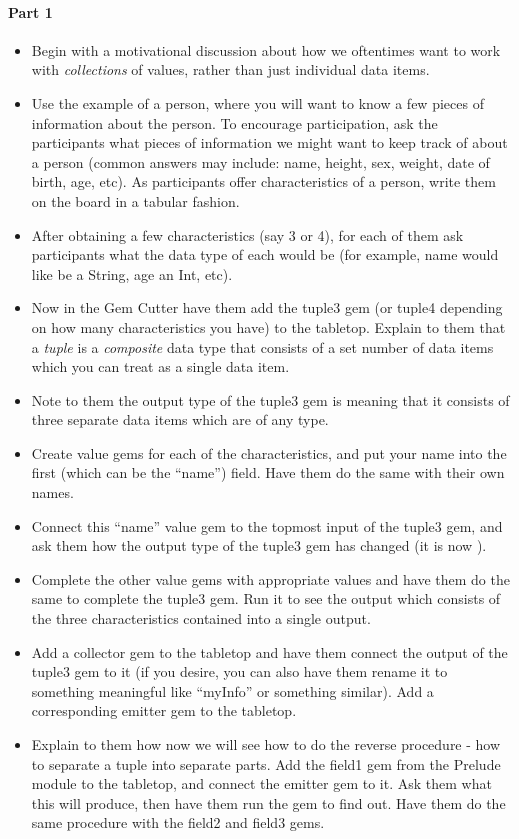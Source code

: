 	{
		\paragraph{Part 1}
		
		\begin{itemize}
			\item Begin with a motivational discussion about how we oftentimes want to work with \emph{collections} of values, rather than just individual data items.
			\item Use the example of a person, where you will want to know a few pieces of information about the person.  To encourage participation, ask the participants what pieces of information we might want to keep track of about a person (common answers may include: name, height, sex, weight, date of birth, age, etc).  As participants offer characteristics of a person, write them on the board in a tabular fashion.
			\item After obtaining a few characteristics (say 3 or 4), for each of them ask participants what the data type of each would be (for example, name would like be a String, age an Int, etc).  
			\item Now in the Gem Cutter have them add the tuple3 gem (or tuple4 depending on how many characteristics you have) to the tabletop.  Explain to them that a \emph{tuple} is a \emph{composite} data type that consists of a set number of data items which you can treat as a single data item.
			\item Note to them the output type of the tuple3 gem is  meaning that it consists of three separate data items which are of any type.
			\item Create value gems for each of the characteristics, and put your name into the first (which can be the ``name'') field.  Have them do the same with their own names.
			\item Connect this ``name'' value gem to the topmost input of the tuple3 gem, and ask them how the output type of the tuple3 gem has changed (it is now ).
			\item Complete the other value gems with appropriate values and have them do the same to complete the tuple3 gem.  Run it to see the output which consists of the three characteristics contained into a single output.
			\item Add a collector gem to the tabletop and have them connect the output of the tuple3 gem to it (if you desire, you can also have them rename it to something meaningful like ``myInfo'' or something similar).  Add a corresponding emitter gem to the tabletop.
			\item Explain to them how now we will see how to do the reverse procedure - how to separate a tuple into separate parts.  Add the field1 gem from the Prelude module to the tabletop, and connect the emitter gem to it.  Ask them what this will produce, then have them run the gem to find out.  Have them do the same procedure with the field2 and field3 gems.
		\end{itemize}
		
}
